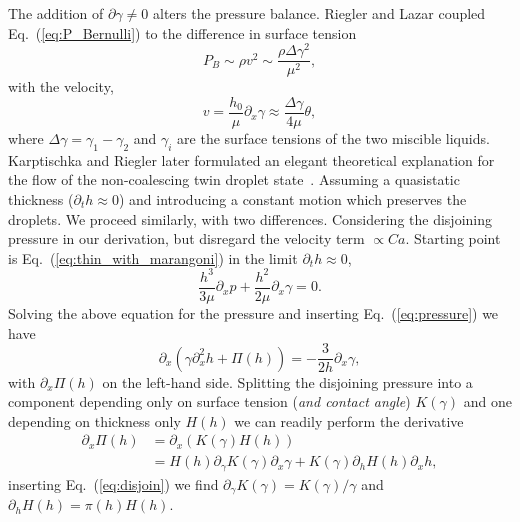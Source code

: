 \documentclass[twocolumn,amsmath,amssymb,showpacs,pre,nofootinbib,superscriptaddress]{revtex4-1} %
\begin{document}
The addition of $\partial\gamma \neq 0$ alters the pressure balance.
Riegler and Lazar coupled Eq.~(\ref{eq:P_Bernulli}) to the difference in surface tension~\cite{doi:10.1021/la800630w}
\begin{equation}\label{eq:P_bernulli_riegler}
    P_{B} \sim \rho v^2 \sim \frac{\rho \Delta\gamma^2}{\mu^2}, 
\end{equation}
with the velocity,
\begin{equation}\label{eq:vel_riegler}
    v = \frac{h_0}{\mu}\partial_x\gamma\approx\frac{\Delta\gamma}{4\mu}\theta,
\end{equation}
where $\Delta\gamma = \gamma_1 - \gamma_2$ and $\gamma_i$ are the surface tensions of the two miscible liquids.
Karptischka and Riegler later formulated an elegant theoretical explanation for the flow of the non-coalescing twin droplet state~\cite{PhysRevLett.109.066103}.
Assuming a quasistatic thickness ($\partial_t h \approx 0$) and introducing a constant motion which preserves the droplets.
We proceed similarly, with two differences. 
Considering the disjoining pressure in our derivation, but disregard the velocity term $\propto Ca$.
Starting point is Eq.~(\ref{eq:thin_with_marangoni}) in the limit $\partial_t h \approx 0$, 
\begin{equation}\label{eq:pressure_noncoal}
    \frac{h^3}{3\mu}\partial_x p + \frac{h^2}{2\mu}\partial_x\gamma = 0.
\end{equation}
Solving the above equation for the pressure and inserting Eq.~(\ref{eq:pressure}) we have
\begin{equation}\label{eq:thin_film_quasistatic_pressure}
    \partial_x (\gamma\partial_x^2 h + \Pi(h)) = - \frac{3}{2 h}\partial_x\gamma,
\end{equation}
with $\partial_x\Pi(h)$ on the left-hand side.
Splitting the disjoining pressure into a component depending only on surface tension (\textit{and contact angle}) $K(\gamma)$ and one depending on thickness only $H(h)$ we can readily perform the derivative
\begin{align}\label{eq:disj_derivative1}
    \partial_x\Pi(h) &= \partial_x (K(\gamma)H(h)) \nonumber\\
    &= H(h)\partial_\gamma K(\gamma)\partial_x\gamma + K(\gamma)\partial_h H(h)\partial_x h,
\end{align}
inserting Eq.~(\ref{eq:disjoin}) we find $\partial_\gamma K(\gamma) =K(\gamma)/\gamma$ and $\partial_h H(h) = \pi(h)H(h)$.
\end{document}
